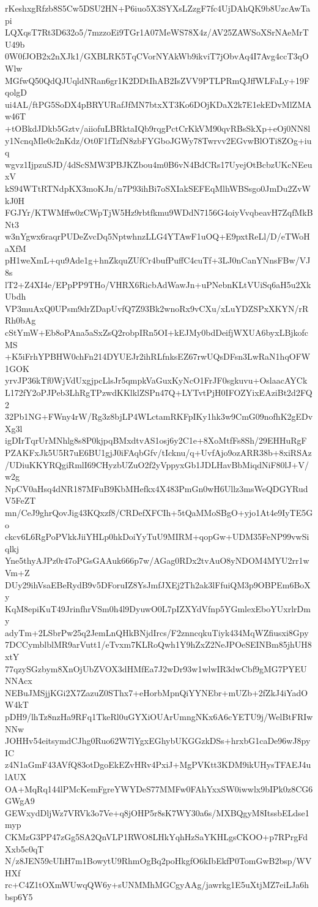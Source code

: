 rKeshxgRfzb8S5Cw5DSU2HN+P6iuo5X3SYXsLZzgF7fc4UjDAhQK9b8UzcAwTapi
LQXqsT7Rt3D632o5/7mzzoEi9TGr1A07MeWS78X4z/AV25ZAWSoXSrNAeMrTU49b
0W0fJOB2x2nXJk1/GXBLRK5TqCVorNYAkWb9ikviT7jObvAq4I7Avg4ccT3qOWlw
MGfwQ50QdQJUqldNRan6gr1K2DDtIhAB2IsZVV9PTLPRmQJffWLFaLy+19FqolgD
ui4AL/ftPG5SoDX4pBRYURafJfMN7btxXT3Ko6DOjKDaX2k7E1ekEDvMlZMAw46T
+tOBkdJDkb5Gztv/aiiofuLBRktaIQb9rqgPctCrKkVM90qvRBsSkXp+eOj0NN8l
y1NcnqMle0c2nKdz/Ot0F1fTzfN8zbFYGboJGWy78Twrvv2EGvwBlOTi8ZOg+iuq
wgvz1IjpzuSJD/4dScSMW3PBJKZbou4m0B6vN4BdCRs17UyejOtBcbzUKcNEeuxV
kS94WTtRTNdpKX3moKJn/n7P93ihBi7oSXIakSEFEqMlhWBSsgo0JmDu2ZvWkJ0H
FGJYr/KTWMffw0zCWpTjW5Hz9rbtfkmu9WDdN7156G4oiyVvqbeavH7ZqfMkBNt3
w3nYgwx6raqrPUDeZvcDq5NptwhnzLLG4YTAwF1uOQ+E9pxtReLl/D/eTWoHaXfM
pH1weXmL+qu9Ade1g+hnZkquZUfCr4bufPuffC4cuTf+3LJ0nCanYNnsFBw/VJ8s
lT2+Z4XI4e/EPpPP9THo/VHRX6RicbAdWawJn+uPNebnKLtVUiSq6aH5u2XkUbdh
VP3muAxQ0UPsm9drZDapUvfQ7Z93Bk2wnoRx9vCXu/xLuYDZSPxXKYN/rRRh0bAg
cStYmW+Eb8oPAna5aSxZsQ2robpIRn5OI+kEJMy0bdDeifjWXUA6byxLBjkofcMS
+K5iFrhYPBHW0chFn214DYUEJr2ihRLfnksEZ67rwUQsDFsn3LwRaN1hqOFW1GOK
yrvJP36kTf0WjVdUxgjpcLlsJr5qmpkVaGuxKyNcO1FrJF0sgkuvu+OslaacAYCk
L172fY2oPJPeb3LhRgTPzwdKKlklZSPn47Q+LYTvtPjH0IFOZYixEAziBt2d2FQ2
32Pb1NG+FWny4rW/Rg3z8bjLP4WLctamRKFpIKy1hk3w9CmG09nofhK2gEDvXg3l
igDIrTqrUrMNhlg8s8P0kjpqBMxdtvAS1osj6y2C1e+8XoMtfFs8Sh/29EHHuRgF
PZAKFxJk5U5R7uE6BU1gjJ0iFAqbGfv/tIcknu/q+UvfAjo9ozARR38b+8xiRSAz
/UDiuKKYRQgiRmlI69CHyzbUZuO2f2yVppyxGb1JDLHavBbMiqdNiF80lJ+V/w2g
NpCV0aHsq4dNR187MFuB9KbMHefkx4X483PmGn0wH6Ullz3msWeQDGYRudV5FeZT
mn/CeJ9ghrQovJig43KQxzf8/CRDefXFCIh+5tQaMMoSBgO+yjo1At4e9IyTE5Go
ckcv6L6RgPoPVkkJiiYHLp0hkDoiYyTuU9MIRM+qopGw+UDM35FeNP99vwSiqlkj
Yne5thyAJPz0r47oPGsGAAuk666p7w/AGag0RDx2tvAuO8yNDOM4MYU2rr1wVm+Z
DUy29ihVsaEBeRydB9v5DForuIZ8YsJmfJXEj2Th2ak3lFfuiQM3p9OBPEm6BoXy
KqM8epiKuT49JrinfhrVSm0h4l9DyuwO0L7pIZXYdVfnp5YGmlexEboYUxrlrDmy
adyTm+2LSbrPw25q2JemLnQHkBNjdIrcs/F2znncqkuTiyk434MqWZfiusxi8Gpy
7DCCymblblMR9arVutt1/eTvxm7KLRoQwh1Y9hZxZ2NeJPOeSEINBm85jhUH8xtY
77qzySGzbym8XnOjUbZVOX3dHMfEa7J2wDr93w1wlwIR3dwCbf9gMG7PYEUNNAcx
NEBuJMSjjKGi2X7ZazuZ0SThx7+eHorbMpnQiYYNEbr+mUZb+2fZkJ4iYadOW4kT
pDH9/lhTz8nzHa9RFq1TkeRl0uGYXiOUArUmngNKx6A6cYETU9j/WelBtFRIwNNw
JOHHv54eitsymdCJhg0Ruo62W7lYgxEGhybUKGGzkDSs+hrxbG1caDe96wJ8pyIC
z4N1aGmF43AVfQ83otDgoEkEZvHRv4PxiJ+MgPVKtt3KDM9ikUHysTFAEJ4ulAUX
OA+MqRq144lPMcKemFgreYWYDeS77MMFw0FAhYxxSW0iwwlx9bIPk0z8CG6GWgA9
GEWxydDljWz7VRVk3o7Ve+q8jOHP5r8sK7WY30a6s/MXBQgyM8ItssbELdse1myp
CKMzG3PP47zGg5SA2QnVLP1RWO8LHkYqhHzSaYKHLgsCKOO+p7RPrgFdXxb5c0qT
N/z8JEN59cUIiH7m1BowytU9RhmOgBq2poHkgfO6kIbEkfP0TomGwB2bsp/WVHXf
rc+C4Z1tOXmWUwqQW6y+sUNMMhMGCgyAAg/jawrkg1E5uXtjMZ7eiLJa6hbsp6Y5
